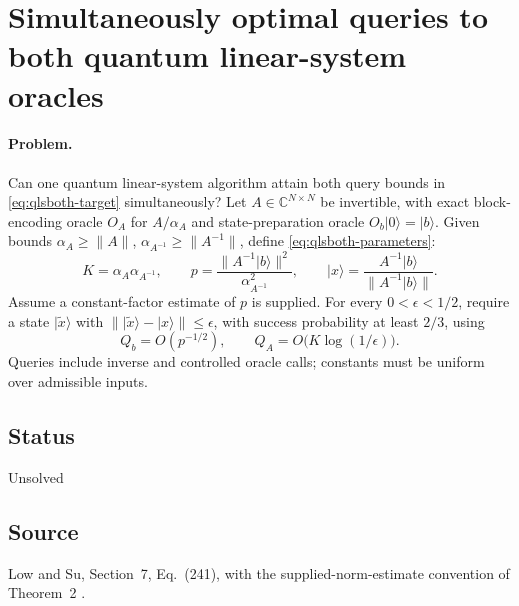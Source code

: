 \section{Simultaneously optimal queries to both quantum linear-system oracles}
\label{sec:op_b0666933a3d77eba}

\paragraph{Problem.}
Can one quantum linear-system algorithm attain both query bounds in \eqref{eq:qlsboth-target} simultaneously?
Let $A\in\mathbb{C}^{N\times N}$ be invertible, with exact block-encoding oracle $O_A$ for $A/\alpha_A$ and state-preparation oracle $O_b\lvert0\rangle=\lvert b\rangle$. Given bounds $\alpha_A\geq\lVert A\rVert$, $\alpha_{A^{-1}}\geq\lVert A^{-1}\rVert$, define \eqref{eq:qlsboth-parameters}:
\begin{equation}
 K=\alpha_A\alpha_{A^{-1}},\qquad
 p=\frac{\lVert A^{-1}\lvert b\rangle\rVert^2}{\alpha_{A^{-1}}^2},\qquad
 \lvert x\rangle=\frac{A^{-1}\lvert b\rangle}{\lVert A^{-1}\lvert b\rangle\rVert}.
 \label{eq:qlsboth-parameters}
\end{equation}
Assume a constant-factor estimate of $p$ is supplied. For every $0<\epsilon<1/2$, require a state $\lvert\widetilde{x}\rangle$ with $\lVert\lvert\widetilde{x}\rangle-\lvert x\rangle\rVert\leq\epsilon$, with success probability at least $2/3$, using
\begin{equation}
 Q_b=O(p^{-1/2}),\qquad Q_A=O\bigl(K\log(1/\epsilon)\bigr).
 \label{eq:qlsboth-target}
\end{equation}
Queries include inverse and controlled oracle calls; constants must be uniform over admissible inputs.

\subsection*{Status}

Unsolved

\subsection*{Source}

Low and Su, Section~7, Eq.~(241), with the supplied-norm-estimate convention of Theorem~2 .

